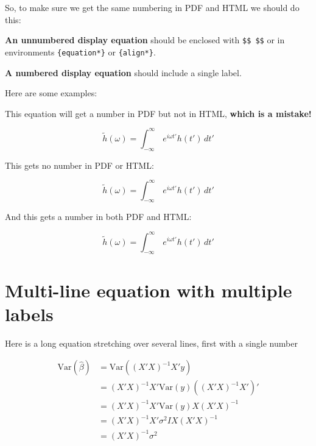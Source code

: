 \documentclass[]{book}
\begin{document}
So, to make sure we get the same numbering in PDF and HTML we should do this:

\textbf{An unnumbered display equation} should be enclosed with \texttt{\$\$\ \$\$} or in environments \texttt{\{equation*\}} or \texttt{\{align*\}}.

\textbf{A numbered display equation} should include a single label.

Here are some examples:

This equation will get a number in PDF but not in HTML, \textbf{which is a mistake!}

\begin{equation} 
  \tilde h(\omega) = \int_{-\infty}^{\infty}\,e^{i\omega t'} h(t') \, dt'
\end{equation}

This gets no number in PDF or HTML:

\begin{equation*} 
  \tilde h(\omega) = \int_{-\infty}^{\infty}\,e^{i\omega t'} h(t') \, dt'
\end{equation*}

And this gets a number in both PDF and HTML:

\begin{equation} 
  \tilde h(\omega) = \int_{-\infty}^{\infty}\,e^{i\omega t'} h(t') \, dt'
  \label{eq:transfu}
\end{equation}

\hypertarget{multi-line-equation-with-multiple-labels}{%
\section{Multi-line equation with multiple labels}\label{multi-line-equation-with-multiple-labels}}

Here is a long equation stretching over several lines, first with a single number

\begin{equation} 
\begin{split}
\mathrm{Var}(\hat{\beta}) & =\mathrm{Var}((X'X)^{-1}X'y)\\
 & =(X'X)^{-1}X'\mathrm{Var}(y)((X'X)^{-1}X')'\\
 & =(X'X)^{-1}X'\mathrm{Var}(y)X(X'X)^{-1}\\
 & =(X'X)^{-1}X'\sigma^{2}IX(X'X)^{-1}\\
 & =(X'X)^{-1}\sigma^{2}
\end{split}
\label{eq:var-beta1}
\end{equation}
\end{document}
